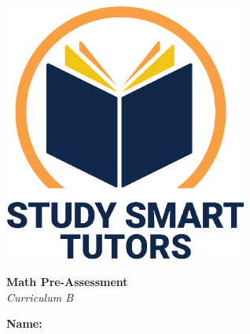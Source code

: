 \documentclass[12pt]{article}
\begin{document}


\newpage
\thispagestyle{empty}
\vspace*{\fill}

\vspace*{10cm}




\newpage





\thispagestyle{empty}

\vspace*{\fill}

\vspace*{3cm}

\begin{center}

    \includegraphics[width=0.6\textwidth]{SST_Color_Logo.png} %
    
    \vspace{2cm} %
    

    
     \Huge \textbf{ Math Pre-Assessment}\\ 
 \vspace{2cm}
    \LARGE \textit{Curriculum B}\\  
    [2cm]

 \vspace{0.5cm}

    \LARGE \textbf{Name:} \underline{\hspace{8cm}}
   
    
    \vfill %
    
\end{center}
\end{document}
